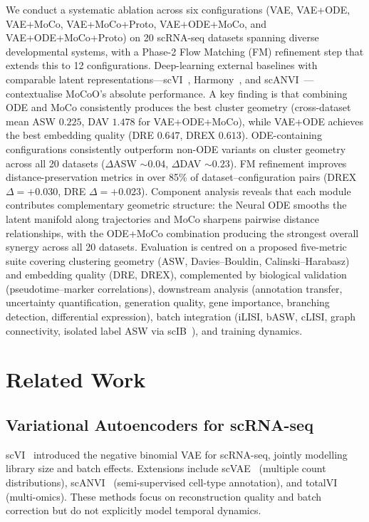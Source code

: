 \documentclass[journal]{IEEEtran}
\begin{document}
We conduct a systematic ablation across six configurations (VAE, VAE+ODE, VAE+MoCo, VAE+MoCo+Proto, VAE+ODE+MoCo, and VAE+ODE+MoCo+Proto) on 20 scRNA-seq datasets spanning diverse developmental systems, with a Phase-2 Flow Matching (FM) refinement step that extends this to 12 configurations. Deep-learning external baselines with comparable latent representations---scVI~\cite{lopez2018deep}, Harmony~\cite{korsunsky2019harmony}, and scANVI~\cite{xu2021probabilistic}---contextualise MoCoO's absolute performance. A key finding is that combining ODE and MoCo consistently produces the best cluster geometry (cross-dataset mean ASW $0.225$, DAV $1.478$ for VAE+ODE+MoCo), while VAE+ODE achieves the best embedding quality (DRE $0.647$, DREX $0.613$). ODE-containing configurations consistently outperform non-ODE variants on cluster geometry across all 20 datasets ($\Delta$ASW ${\sim}0.04$, $\Delta$DAV ${\sim}0.23$). FM refinement improves distance-preservation metrics in over 85\% of dataset--configuration pairs (DREX $\Delta{=}+0.030$, DRE $\Delta{=}+0.023$). Component analysis reveals that each module contributes complementary geometric structure: the Neural ODE smooths the latent manifold along trajectories and MoCo sharpens pairwise distance relationships, with the ODE+MoCo combination producing the strongest overall synergy across all 20 datasets. Evaluation is centred on a proposed five-metric suite covering clustering geometry (ASW, Davies--Bouldin, Calinski--Harabasz) and embedding quality (DRE, DREX), complemented by biological validation (pseudotime--marker correlations), downstream analysis (annotation transfer, uncertainty quantification, generation quality, gene importance, branching detection, differential expression), batch integration (iLISI, bASW, cLISI, graph connectivity, isolated label ASW via scIB~\cite{luecken2022scib}), and training dynamics.

\section{Related Work}
\label{sec:related}

\subsection{Variational Autoencoders for scRNA-seq}
\label{sec:related:vae}

scVI~\cite{lopez2018deep} introduced the negative binomial VAE for scRNA-seq, jointly modelling library size and batch effects. Extensions include scVAE~\cite{gronbech2020scvae} (multiple count distributions), scANVI~\cite{xu2021probabilistic} (semi-supervised cell-type annotation), and totalVI~\cite{gayoso2021joint} (multi-omics). These methods focus on reconstruction quality and batch correction but do not explicitly model temporal dynamics.
\end{document}
